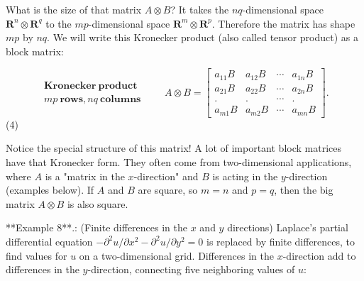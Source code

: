 What is the size of that matrix \(A\otimes B\)? It takes the \(nq\)-dimensional space \(\mathbf{R}^{n}\otimes\mathbf{R}^{q}\) to the \(mp\)-dimensional space \(\mathbf{R}^{m}\otimes\mathbf{R}^{p}\). Therefore the matrix has shape \(mp\) by \(nq\). We will write this Kronecker product (also called tensor product) as a block matrix:

\[\begin{array}{ccccc}\mathbf{Kronecker\ product}\\ mp\ \mathbf{rows},nq\ \mathbf{columns}\end{array}\qquad A\otimes B=\begin{bmatrix}a_{11}B&a_{ 12}B&\cdots&a_{1n}B\\ a_{21}B&a_{22}B&\cdots&a_{2n}B\\ .&.&\cdots&.\\ a_{m1}B&a_{m2}B&\cdots&a_{mn}B\end{bmatrix}.\] (4)

Notice the special structure of this matrix! A lot of important block matrices have that Kronecker form. They often come from two-dimensional applications, where \(A\) is a "matrix in the \(x\)-direction" and \(B\) is acting in the \(y\)-direction (examples below). If \(A\) and \(B\) are square, so \(m=n\) and \(p=q\), then the big matrix \(A\otimes B\) is also square.

**Example 8**.: (Finite differences in the \(x\) and \(y\) directions) Laplace's partial differential equation \(-\partial^{2}u/\partial x^{2}-\partial^{2}u/\partial y^{2}=0\) is replaced by finite differences, to find values for \(u\) on a two-dimensional grid. Differences in the \(x\)-direction add to differences in the \(y\)-direction, connecting five neighboring values of \(u\): 